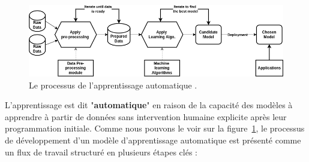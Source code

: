 \begin{figure}[H]
    \centering
    \includegraphics[width=15cm]{gfx/fig-machine-learning-process.png}
    \caption{Le processus de l'apprentissage automatique \cite{mlprocess}.}
    \label{fig:mlprocess}
\end{figure}

L'apprentissage est dit "\textbf{automatique}" en raison de la capacité des modèles à apprendre à partir de données sans intervention humaine explicite après leur programmation initiale. Comme nous pouvons le voir sur la figure~\ref{fig:mlprocess}, le processus de développement d'un modèle d'apprentissage automatique est présenté comme un flux de travail structuré en plusieurs étapes clés :

